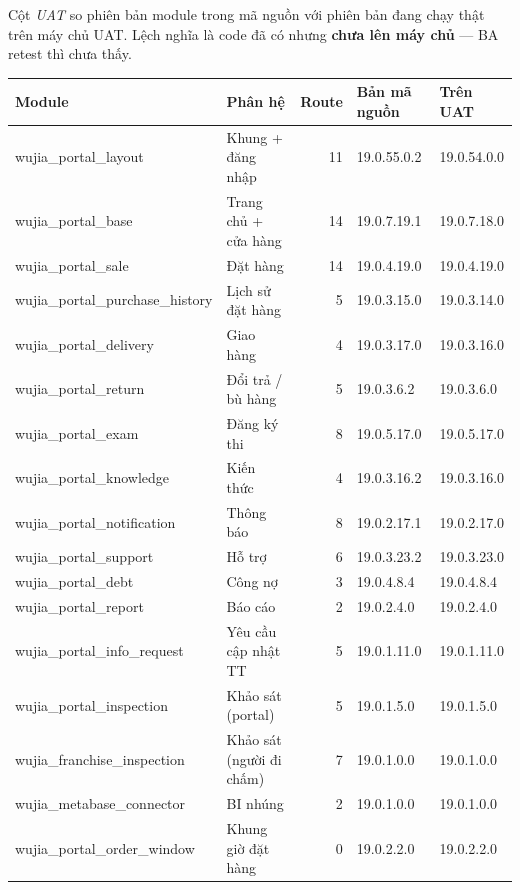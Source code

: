 \documentclass[11pt,a4paper]{report}
\newcommand{\rt}[1]{{\ttfamily\footnotesize #1}}
\begin{document}
Cột \textit{UAT} so phiên bản module trong mã nguồn với phiên bản đang chạy thật trên máy chủ
UAT. Lệch nghĩa là code đã có nhưng \textbf{chưa lên máy chủ} — BA retest thì chưa thấy.

\begin{center}
\small
\begin{tabular}{@{}llrll@{}}
\toprule
\textbf{Module} & \textbf{Phân hệ} & \textbf{Route} & \textbf{Bản mã nguồn} & \textbf{Trên UAT} \\
\midrule
\rt{wujia\_portal\_layout} & Khung + đăng nhập & 11 & 19.0.55.0.2 & \textcolor{partc}{19.0.54.0.0} \\
\rt{wujia\_portal\_base} & Trang chủ + cửa hàng & 14 & 19.0.7.19.1 & \textcolor{partc}{19.0.7.18.0} \\
\rt{wujia\_portal\_sale} & Đặt hàng & 14 & 19.0.4.19.0 & 19.0.4.19.0 \\
\rt{wujia\_portal\_purchase\_history} & Lịch sử đặt hàng & 5 & 19.0.3.15.0 & \textcolor{partc}{19.0.3.14.0} \\
\rt{wujia\_portal\_delivery} & Giao hàng & 4 & 19.0.3.17.0 & \textcolor{partc}{19.0.3.16.0} \\
\rt{wujia\_portal\_return} & Đổi trả / bù hàng & 5 & 19.0.3.6.2 & \textcolor{partc}{19.0.3.6.0} \\
\rt{wujia\_portal\_exam} & Đăng ký thi & 8 & 19.0.5.17.0 & 19.0.5.17.0 \\
\rt{wujia\_portal\_knowledge} & Kiến thức & 4 & 19.0.3.16.2 & \textcolor{partc}{19.0.3.16.0} \\
\rt{wujia\_portal\_notification} & Thông báo & 8 & 19.0.2.17.1 & \textcolor{partc}{19.0.2.17.0} \\
\rt{wujia\_portal\_support} & Hỗ trợ & 6 & 19.0.3.23.2 & \textcolor{partc}{19.0.3.23.0} \\
\rt{wujia\_portal\_debt} & Công nợ & 3 & 19.0.4.8.4 & 19.0.4.8.4 \\
\rt{wujia\_portal\_report} & Báo cáo & 2 & 19.0.2.4.0 & 19.0.2.4.0 \\
\rt{wujia\_portal\_info\_request} & Yêu cầu cập nhật TT & 5 & 19.0.1.11.0 & 19.0.1.11.0 \\
\rt{wujia\_portal\_inspection} & Khảo sát (portal) & 5 & 19.0.1.5.0 & 19.0.1.5.0 \\
\rt{wujia\_franchise\_inspection} & Khảo sát (người đi chấm) & 7 & 19.0.1.0.0 & 19.0.1.0.0 \\
\rt{wujia\_metabase\_connector} & BI nhúng & 2 & 19.0.1.0.0 & 19.0.1.0.0 \\
\midrule
\rt{wujia\_portal\_order\_window} & Khung giờ đặt hàng & 0 & 19.0.2.2.0 & 19.0.2.2.0 \\
\bottomrule
\end{tabular}
\end{center}
\end{document}
